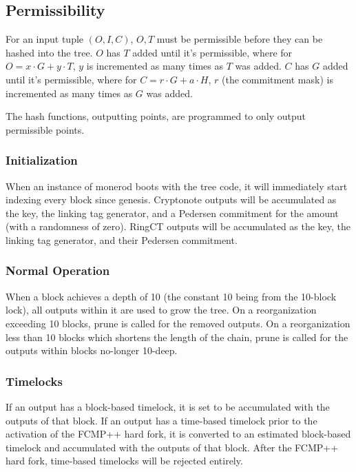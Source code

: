 \documentclass[]{article}
\begin{document}
\subsection{Permissibility}

For an input tuple $(O, I, C)$, $O, T$ must be permissible before they can be hashed into the tree. $O$ has $T$ added until it's permissible, where for $O = x \cdot G + y \cdot T$, $y$ is incremented as many times as $T$ was added. $C$ has $G$ added until it's permissible, where for $C = r \cdot G + a \cdot H$, $r$ (the commitment mask) is incremented as many times as $G$ was added.

The hash functions, outputting points, are programmed to only output permissible points.

\subsubsection{Initialization}

When an instance of monerod boots with the tree code, it will immediately start indexing every block since genesis. Cryptonote outputs will be accumulated as the key, the linking tag generator, and a Pedersen commitment for the amount (with a randomness of zero). RingCT outputs will be accumulated as the key, the linking tag generator, and their Pedersen commitment.

\subsubsection{Normal Operation}

When a block achieves a depth of 10 (the constant 10 being from the 10-block lock), all outputs within it are used to grow the tree. On a reorganization exceeding 10 blocks, prune is called for the removed outputs. On a reorganization less than 10 blocks which shortens the length of the chain, prune is called for the outputs within blocks no-longer 10-deep.

\subsubsection{Timelocks}

If an output has a block-based timelock, it is set to be accumulated with the outputs of that block. If an output has a time-based timelock prior to the activation of the FCMP++ hard fork, it is converted to an estimated block-based timelock and accumulated with the outputs of that block. After the FCMP++ hard fork, time-based timelocks will be rejected entirely.
\end{document}

